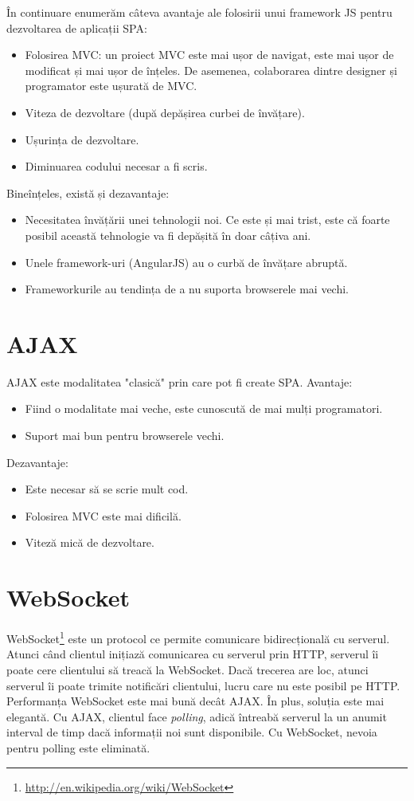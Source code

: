 În continuare enumerăm câteva avantaje ale folosirii unui framework JS pentru
dezvoltarea de aplicații SPA:
\begin{itemize}
  \item Folosirea MVC: un proiect MVC este mai ușor de navigat, este mai ușor
  de modificat și mai ușor de înțeles. De asemenea, colaborarea dintre
  designer și programator este ușurată de MVC.
  \item Viteza de dezvoltare (după depășirea curbei de învățare).
  \item Ușurința de dezvoltare.
  \item Diminuarea codului necesar a fi scris.
\end{itemize}

Bineînțeles, există și dezavantaje:
\begin{itemize}
  \item Necesitatea învățării unei tehnologii noi. Ce este și mai trist, este
  că foarte posibil această tehnologie va fi depășită în doar câțiva ani.
  \item Unele framework-uri (AngularJS) au o curbă de învățare abruptă.
  \item Frameworkurile au tendința de a nu suporta browserele mai vechi.
\end{itemize}


\section{AJAX}
AJAX este modalitatea "clasică" prin care pot fi create SPA.
Avantaje:
\begin{itemize}
\item Fiind o modalitate mai veche, este cunoscută de mai mulți programatori.
\item Suport mai bun pentru browserele vechi.
\end{itemize}
Dezavantaje:
\begin{itemize}
\item Este necesar să se scrie mult cod.
\item Folosirea MVC este mai dificilă.
\item Viteză mică de dezvoltare.
\end{itemize}

\section{WebSocket}
WebSocket\footnote{\url{http://en.wikipedia.org/wiki/WebSocket}} este un protocol
ce permite comunicare bidirecțională cu serverul. Atunci când clientul
inițiază comunicarea cu serverul prin HTTP, serverul îi poate cere clientului
să treacă la WebSocket. Dacă trecerea are loc, atunci serverul îi poate trimite
notificări clientului, lucru care nu este posibil pe HTTP.
Performanța WebSocket este mai bună decât AJAX. În plus, soluția este mai elegantă.
Cu AJAX, clientul face \emph{polling}, adică întreabă serverul la un anumit interval
de timp dacă informații noi sunt disponibile. Cu WebSocket, nevoia pentru polling
este eliminată.

